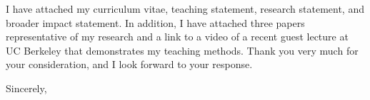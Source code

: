 \documentclass{letter}
\begin{document}
\begin{letter}{}
I have attached
my curriculum vitae,
teaching statement,
research statement,
and broader impact statement.
In addition, I have attached three papers representative of my research and a
link to a video of a recent guest lecture at UC Berkeley that demonstrates my
teaching methods.
%
Thank you very much for your consideration, and I look forward to your response.

\closing{Sincerely,}

\end{letter}
\end{document}
